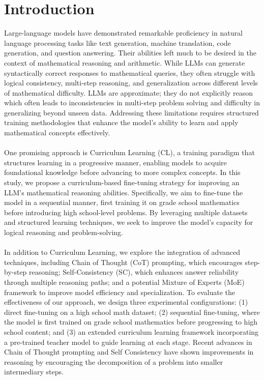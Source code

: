 \section{Introduction}

Large-language models have demonstrated remarkable proficiency in natural language processing tasks like text generation, machine translation, code generation, and question answering. Their abilities left much to be desired in the context of mathematical reasoning and arithmetic. While LLMs can generate syntactically correct responses to mathematical queries, they often struggle with logical consistency, multi-step reasoning, and generalization across different levels of mathematical difficulty. LLMs are approximate; they do not explicitly reason which often leads to inconsistencies in multi-step problem solving and difficulty in generalizing beyond unseen data. Addressing these limitations requires structured training methodologies that enhance the model’s ability to learn and apply mathematical concepts effectively. 
\\\\
One promising approach is Curriculum Learning (CL), a training paradigm that structures learning in a progressive manner, enabling models to acquire foundational knowledge before advancing to more complex concepts. In this study, we propose a curriculum-based fine-tuning strategy for improving an LLM’s mathematical reasoning abilities. Specifically, we aim to fine-tune the model in a sequential manner, first training it on grade school mathematics before introducing high school-level problems. By leveraging multiple datasets and structured learning techniques, we seek to improve the model’s capacity for logical reasoning and problem-solving. 
\\\\
In addition to Curriculum Learning, we explore the integration of advanced techniques, including Chain of Thought (CoT) prompting, which encourages step-by-step reasoning; Self-Consistency (SC), which enhances answer reliability through multiple reasoning paths; and a potential Mixture of Experts (MoE) framework to improve model efficiency and specialization. To evaluate the effectiveness of our approach, we design three experimental configurations: (1) direct fine-tuning on a high school math dataset; (2) sequential fine-tuning, where the model is first trained on grade school mathematics before progressing to high school content; and (3) an extended curriculum learning framework incorporating a pre-trained teacher model to guide learning at each stage. Recent advances in Chain of Thought prompting and Self Consistency have shown improvements in reasoning by encouraging the decomposition of a problem into smaller intermediary steps.  
